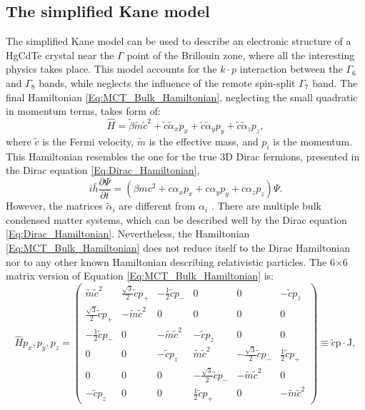 \documentclass[titlepage,a4paper]{book}
\newcommand{\wciecie}{\quad\phantom{v}}
\begin{document}
\subsection{The simplified Kane model}
\wciecie
The simplified Kane model \cite{Kane_MCT}\cite{Kane_Model} can be used to describe an electronic structure of a HgCdTe crystal near the $\Gamma$ point of the Brillouin zone, where all the interesting physics takes place. This model accounts for the $k\cdot p$ interaction between the $\Gamma_6$ and $\Gamma_8$ bands, while neglects the influence of the remote spin-split $\Gamma_7$ band. The final Hamiltonian \ref{Eq:MCT_Bulk_Hamiltonian}, neglecting the small quadratic in momentum terms, takes form of:
\begin{equation}
\label{Eq:MCT_Bulk_Hamiltonian}
\hat{H} = \tilde{\beta} \tilde{m}\tilde{c}^2 + \tilde{c}\tilde{\alpha}_x p_x + \tilde{c}\tilde{\alpha}_y p_y + \tilde{c}\tilde{\alpha}_z p_z ,
\end{equation}
where $\tilde{c}$ is the Fermi velocity, $\tilde{m}$ is the effective mass, and $p_i$ is the momentum. This Hamiltonian resembles the one for the true 3D Dirac fermions, presented in the Dirac equation \ref{Eq:Dirac_Hamiltonian}, 
\begin{equation}
\label{Eq:Dirac_Hamiltonian}
i\bar{h} \frac{\partial \Psi}{\partial t} = \left( \beta mc^2 + c\alpha_x p_x + c\alpha_y p_y + c\alpha_z p_z \right) \Psi.
\end{equation}
However, the matrices $\tilde{\alpha}_i$ are different from $\alpha_i$ \cite{Teppe_MCT}. There are multiple bulk condensed matter systems, which can be described well by the Dirac equation \ref{Eq:Dirac_Hamiltonian}. Nevertheless, the Hamiltonian \ref{Eq:MCT_Bulk_Hamiltonian} does not reduce itself to the Dirac Hamiltonian nor to any other known Hamiltonian describing relativistic particles. The 6$\times$6 matrix version of Equation \ref{Eq:MCT_Bulk_Hamiltonian} is:
\begin{equation}
\label{Eq:MCT_Bulk_Hamiltonian_Matrix}
\hat{H}{p_x, p_y, p_z} = \left( \begin{array}{cccccc}
\tilde{m}\tilde{c}^2 & \frac{\sqrt{3}}{2}\tilde{c}{p_+} & -\frac{1}{2}\tilde{c}{p_{-}} & 0 & 0 & -\tilde{c}p_z \\
\frac{\sqrt{3}}{2}\tilde{c}{p_+} & -\tilde{m}\tilde{c}^2 & 0 & 0 & 0 & 0 \\
-\frac{1}{2}\tilde{c}{p_-} & 0 & -\tilde{m}\tilde{c}^2 & -\tilde{c}p_z & 0 & 0 \\
0 & 0 & -\tilde{c}p_z & \tilde{m}\tilde{c}^2 & -\frac{\sqrt{3}}{2}\tilde{c}{p_-} & \frac{1}{2}\tilde{c}{p_+} \\
0 & 0 & 0 & -\frac{\sqrt{3}}{2}\tilde{c}{p_-} & -\tilde{m}\tilde{c}^2 &0 \\
-\tilde{c}p_z & 0 & 0 & \frac{1}{2}\tilde{c}{p_+} & 0 & -\tilde{m}\tilde{c}^2 \end{array} \right) \equiv \tilde{c}\boldsymbol{\mathrm{p}} \cdot \boldsymbol{\mathrm{J}},
\end{equation}
\end{document}
